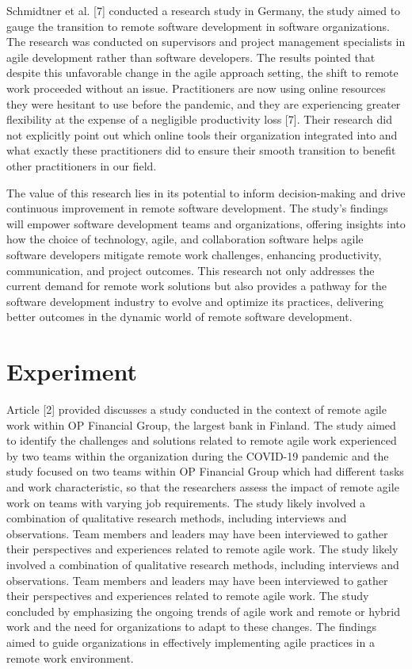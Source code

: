 \documentclass[conference]{IEEEtran}
\begin{document}
Schmidtner et al. [7] conducted a research study in Germany, the study aimed to gauge the transition to remote software development in software organizations. The research was conducted on supervisors and project management specialists in agile development rather than software developers. The results pointed that despite this unfavorable change in the agile approach setting, the shift to remote work proceeded without an issue. Practitioners are now using online resources they were hesitant to use before the pandemic, and they are experiencing greater flexibility at the expense of a negligible productivity loss [7]. Their research did not explicitly point out which online tools their organization integrated into and what exactly these practitioners did to ensure their smooth transition to benefit other practitioners in our field.

The value of this research lies in its potential to inform decision-making and drive continuous improvement in remote software development. The study's findings will empower software development teams and organizations, offering insights into how the choice of technology, agile, and collaboration software helps agile software developers mitigate remote work challenges, enhancing productivity, communication, and project outcomes. This research not only addresses the current demand for remote work solutions but also provides a pathway for the software development industry to evolve and optimize its practices, delivering better outcomes in the dynamic world of remote software development.

\section{Experiment}
Article [2] provided discusses a study conducted in the context of remote agile work within OP Financial Group, the largest bank in Finland. The study aimed to identify the challenges and solutions related to remote agile work experienced by two teams within the organization during the COVID-19 pandemic and the study focused on two teams within OP Financial Group which had different tasks and work characteristic, so that the researchers assess the impact of remote agile work on teams with varying job requirements. The study likely involved a combination of qualitative research methods, including interviews and observations. Team members and leaders may have been interviewed to gather their perspectives and experiences related to remote agile work. The study likely involved a combination of qualitative research methods, including interviews and observations. Team members and leaders may have been interviewed to gather their perspectives and experiences related to remote agile work. The study concluded by emphasizing the ongoing trends of agile work and remote or hybrid work and the need for organizations to adapt to these changes. The findings aimed to guide organizations in effectively implementing agile practices in a remote work environment.
\end{document}
